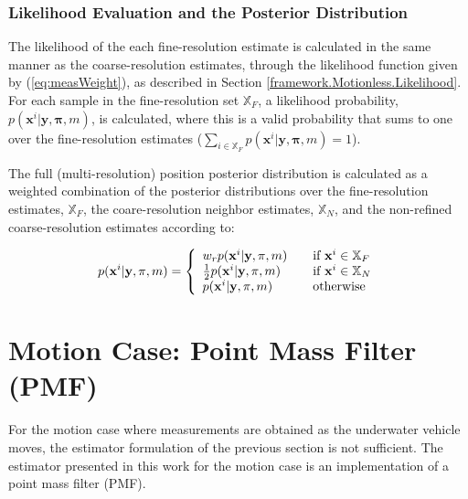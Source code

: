 \subsubsection{Likelihood Evaluation and the Posterior Distribution}
\label{framework.Motionless.Estimate.Likelihood}

The likelihood of the each fine-resolution estimate is calculated in the same manner as the coarse-resolution estimates, through the likelihood function given by (\ref{eq:measWeight}), as described in Section \ref{framework.Motionless.Likelihood}.
For each sample in the fine-resolution set $\mathbb{X}_F$, a likelihood probability, $p(\mathbf{x}^{i} | \mathbf{y}, \mathbf{\pi}, m)$, is calculated, where this is a valid probability that sums to one over the fine-resolution estimates ($ \sum_{i \in \mathbb{X}_F} p(\mathbf{x}^{i} | \mathbf{y}, \mathbf{\pi}, m) = 1$).

The full (multi-resolution) position posterior distribution is calculated as a weighted combination of the posterior distributions over the fine-resolution estimates, $\mathbb{X}_F$,  the coare-resolution neighbor estimates, $\mathbb{X}_N$, and the non-refined coarse-resolution estimates according to:

\begin{align}
\begin{split}
p(\mathbf{x}^{i} | \mathbf{y}, \mathbf{\pi}, m) = \left\{ 
  \begin{array}{l l}
    w_r p(\mathbf{x}^{i} | \mathbf{y}, \mathbf{\pi}, m) & \quad \text{if $\mathbf{x}^{i} \in \mathbb{X}_F$} \\
    \frac{1}{2} p(\mathbf{x}^{i} | \mathbf{y}, \mathbf{\pi}, m) & \quad \text{if $\mathbf{x}^{i} \in \mathbb{X}_N$} \\
    p(\mathbf{x}^{i} | \mathbf{y}, \mathbf{\pi}, m) & \quad \text{otherwise}
  \end{array} \right.
\end{split}
\label{eq:posteriorProb}
\end{align}


\section{Motion Case: Point Mass Filter (PMF)}
\label{framework.PMF}

For the motion case where measurements are obtained as the underwater vehicle moves, the estimator formulation of the previous section is not sufficient.  
The estimator presented in this work for the motion case is an implementation of a point mass filter (PMF).

